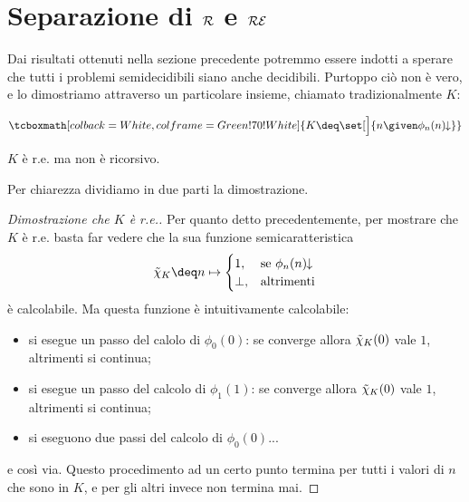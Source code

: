 \section{Separazione di \texorpdfstring{$\mathcal{R}$ e $\mathcal{RE}$}{R e RE}}

Dai risultati ottenuti nella sezione precedente potremmo essere indotti a sperare che tutti i problemi semidecidibili siano anche decidibili. Purtoppo ciò non è vero, e lo dimostriamo attraverso un particolare insieme, chiamato tradizionalmente $K$:

\begin{equation}
    \tcboxmath[colback=White, colframe=Green!70!White]{K \deq \set[\Big]{n \given \phi_n(n)\conv}}
\end{equation}

\begin{theorem}
    $K$ è r.e. ma non è ricorsivo.
\end{theorem}

Per chiarezza dividiamo in due parti la dimostrazione.

\begin{proof}[Dimostrazione che $K$ è r.e.]
    Per quanto detto precedentemente, per mostrare che $K$ è r.e. basta far vedere che la sua funzione semicaratteristica \[
        \scharf{K} \deq n \mapsto \begin{cases}
            1, &\text{se } \phi_n(n)\conv \\
            \bot, &\text{altrimenti}
        \end{cases}
    \] è calcolabile. Ma questa funzione è intuitivamente calcolabile: \begin{itemize}
        \item si esegue un passo del calolo di $\phi_0(0)$: se converge allora $\tilde{\chi}_{K}(0)$ vale $1$, altrimenti si continua;
        \item si esegue un passo del calcolo di $\phi_1(1)$: se converge allora $\tilde{\chi}_{K}(0)$ vale $1$, altrimenti si continua;
        \item si eseguono due passi del calcolo di $\phi_0(0)$...       
    \end{itemize} e così via. Questo procedimento ad un certo punto termina per tutti i valori di $n$ che sono in $K$, e per gli altri invece non termina mai.
\end{proof}

